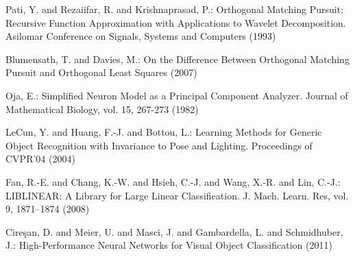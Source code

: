 \documentclass[runningheads,a4paper]{llncs}
\begin{document}
\begin{thebibliography}{4}
 Pati, Y. and Rezaiifar, R. and Krishnaprasad, P.: Orthogonal Matching Pursuit: Recursive Function Approximation with Applications to Wavelet Decomposition. Asilomar Conference on Signals, Systems and Computers (1993)

 Blumensath, T. and Davies, M.: On the Difference Between Orthogonal Matching Pursuit and Orthogonal Least Squares (2007)

 Oja, E.: Simplified Neuron Model as a Principal Component Analyzer. Journal of Mathematical Biology, vol. 15, 267-273 (1982)

 LeCun, Y. and Huang, F.-J. and Bottou, L.: Learning Methods for Generic Object Recognition with Invariance to Pose and Lighting. Proceedings of CVPR'04 (2004)

 Fan, R.-E. and Chang, K.-W. and Hsieh, C.-J. and Wang, X.-R. and Lin, C.-J.: LIBLINEAR: A Library for Large Linear Classification. J. Mach. Learn. Res, vol. 9, 1871--1874 (2008)

 Cire\c{s}an, D. and Meier, U. and Masci, J. and Gambardella, L. and Schmidhuber, J.: High-Performance Neural Networks for Visual Object Classification (2011)

\end{thebibliography}
\end{document}
